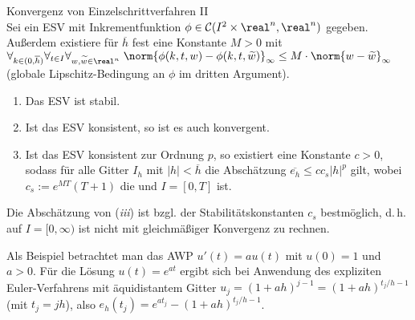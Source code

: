 \begin{Satz}{Konvergenz von Einzelschrittverfahren II}\\
    Sei ein ESV mit Inkrementfunktion
    $\phi \in \C(I^2 \times \real^n, \real^n)$ gegeben.
    Außerdem existiere für $\overline{h}$ fest eine Konstante $M > 0$ mit
    $\forall_{k \in (0, \overline{h})} \forall_{t \in I}
    \forall_{w, \widetilde{w} \in \real^n}\;
    \norm{\phi(k, t, w) - \phi(k, t, \widetilde{w})}_\infty \le
    M \cdot \norm{w - \widetilde{w}}_\infty$\\
    (globale Lipschitz-Bedingung an $\phi$ im dritten Argument).
    \begin{enumerate}[label=(\emph{\roman*})]
        \item
        Das ESV ist stabil.
        
        \item
        Ist das ESV konsistent, so ist es auch konvergent.
        
        \item
        Ist das ESV konsistent zur Ordnung $p$, so existiert eine
        Konstante $c > 0$, sodass für alle Gitter $I_h$ mit
        $|h| < \overline{h}$ die Abschätzung
        $\overline{e_h} \le c c_s |h|^p$ gilt, wobei
        $c_s := e^{MT} (T+1)$ die  und
        $I = [0, T]$ ist.
    \end{enumerate}
\end{Satz}

\begin{Bem}
    Die Abschätzung von (\emph{iii}) ist bzgl. der Stabilitätskonstanten $c_s$
    bestmöglich, d.\,h. auf $I = [0, \infty)$ ist nicht mit gleichmäßiger
    Konvergenz zu rechnen.
\end{Bem}

\begin{Bsp}
    Als Beispiel betrachtet man das AWP $u'(t) = a u(t)$ mit $u(0) = 1$ und
    $a > 0$.
    Für die Lösung $u(t) = e^{at}$ ergibt sich bei Anwendung des expliziten
    Euler-Verfahrens mit äquidistantem Gitter
    $u_j = (1 + ah)^{j-1} = (1 + ah)^{t_j/h - 1}$ (mit $t_j = jh$), also
    $e_h(t_j) = e^{a t_j} - (1 + ah)^{t_j/h - 1}$.
\end{Bsp}

